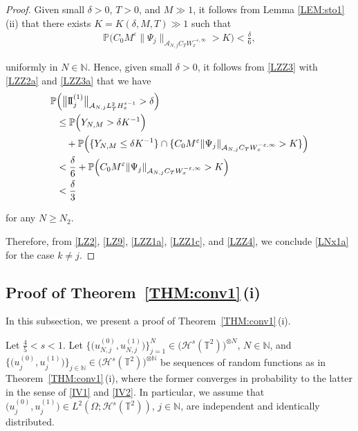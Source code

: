 \documentclass[letterpaper, 11pt,  reqno]{amsart}
\newcommand{\1}{\hspace{0.5mm}\text{I}\hspace{0.2mm}}
\newcommand{\II}{\text{I \hspace{-2.8mm} I} }
\newcommand{\noi}{\noindent}
\newcommand{\T}{\mathbb{T}}
\newcommand{\N}{\mathbb{N}}
\newcommand{\PP}{\mathbb{P}}
\renewcommand{\H}{\mathcal{H}}
\newcommand{\eps}{\varepsilon}
\newcommand{\dl}{\delta}
\newcommand{\A}{\mathcal{A}}
\renewcommand{\O}{\Omega}
\numberwithin{equation}{section}
\numberwithin{theorem}{section}
\begin{document}
\begin{proof}
\noi
Given small $\dl > 0$, $T > 0$, and $M \gg 1$, 
it follows from 
 Lemma \ref{LEM:sto1}\,(ii)
that 
there exists $K = K(\dl, M, T) \gg1$ such that 
\begin{align}
\PP\Big(C_0  
M^\eps
\|\Psi_{j}\|_{\A_{N, j}C_T W^{-\eps, \infty}_x} > K\Big)
< \frac \dl 6, 
\label{LZZ3a}
\end{align}

\noi
uniformly in $N \in \N$.
Hence, given small $\dl > 0$, 
it follows from \eqref{LZZ3}
with \eqref{LZZ2a} and \eqref{LZZ3a}
that 
we have 
\begin{align}
\begin{split}
\PP & \Big( \big\|\II_j^{(1)} \big\|_{\A_{N, j}L^2_T H^{s-1}_x}> \dl \Big) \\
& \le 
\PP\Big(Y_{N, M} > \dl K^{-1} \Big)\\
& \quad  + 
\PP\Big(\{Y_{N, M} \le  \dl K^{-1}\}
\cap 
\{C_0  
M^\eps
\|\Psi_{j}\|_{\A_{N, j}C_T W^{-\eps, \infty}_x} > K\}\Big)\\
& < \frac \dl 6 + 
\PP\Big(C_0  
M^\eps
\|\Psi_{j}\|_{\A_{N, j}C_T W^{-\eps, \infty}_x} > K\Big)\\
& < \frac \dl 3
\end{split}
\label{LZZ4}
\end{align}

\noi
for any $N \ge N_2$.





Therefore,  from \eqref{LZ2}, \eqref{LZ9}, \eqref{LZZ1a}, \eqref{LZZ1c},  and \eqref{LZZ4}, 
we conclude
 \eqref{LNx1a} 
for the case $k \ne  j$.
\end{proof}






\subsection{Proof of Theorem~\ref{THM:conv1}\,(i)}
\label{SUBSEC:5.2}




In this subsection, 
we present a proof of Theorem~\ref{THM:conv1}\,(i).



Let $\frac 45 < s < 1$.
Let 
$\big\{ \big(u_{N, j}^{(0)}, u_{N, j}^{(1)}\big)\big\}_{j = 1}^N
\in \big(\H^s (\T^2)\big)^{\otimes N}$, $N \in \N$, 
and 
$\big\{\big(u_{j}^{(0)}, u_{ j}^{(1)}\big)\big\}_{j \in \N}
\in \big(\H^s (\T^2)\big)^{\otimes \N}$
be  sequences of random functions
as in
Theorem~\ref{THM:conv1}\,(i), 
where the former converges in probability to the latter in the sense
of \eqref{IV1} and \eqref{IV2}.
In particular, we assume that 
$\big(u_{j}^{(0)}, u_{ j}^{(1)}\big)
\in L^2(\O; \H^s (\T^2))$, $j \in \N$, 
 are independent and identically distributed.
\end{document}
